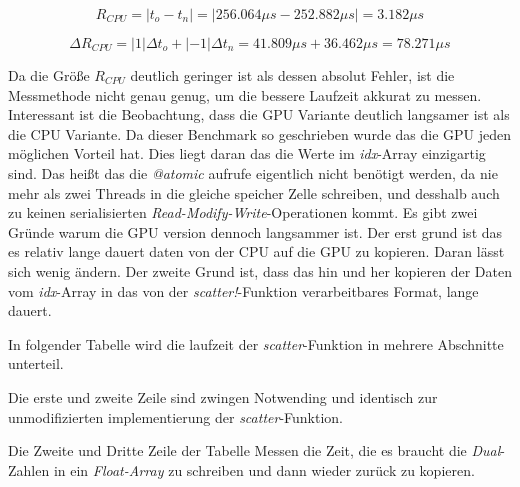 $$
R_{CPU} = |t_o - t_n| = | 256.064 \mu s - 252.882 \mu s | =  3.182 \mu s
$$

$$
\Delta R_{CPU} = | 1 | \Delta t_o + |-1| \Delta t_n  = 41.809 \mu s + 36.462 \mu s = 78.271 \mu s
$$


Da die Größe $R_{CPU}$ deutlich geringer ist als dessen absolut Fehler, ist die Messmethode nicht genau genug, um die bessere Laufzeit akkurat zu messen.
Interessant ist die Beobachtung, dass die GPU Variante deutlich langsamer ist als die CPU Variante.
Da dieser Benchmark so geschrieben wurde das die GPU jeden möglichen Vorteil hat.
Dies liegt daran das die Werte im \textit{idx}-Array einzigartig sind.
Das heißt das die \textit{@atomic} aufrufe eigentlich nicht benötigt werden, da nie mehr als zwei Threads in die gleiche speicher Zelle schreiben,
und desshalb auch zu keinen serialisierten \textit{Read-Modify-Write}-Operationen kommt.
Es gibt zwei Gründe warum die GPU version dennoch langsammer ist.
Der erst grund ist das es relativ lange dauert daten von der CPU auf die GPU zu kopieren.
Daran lässt sich wenig ändern.
Der zweite Grund ist, dass das hin und her kopieren der Daten vom \textit{idx}-Array in das von der \textit{scatter!}-Funktion verarbeitbares Format, 
lange dauert. 


In folgender Tabelle wird die laufzeit der \textit{scatter}-Funktion in mehrere Abschnitte unterteil.

Die erste und zweite Zeile sind zwingen Notwending und identisch zur unmodifizierten implementierung der \textit{scatter}-Funktion.

Die Zweite und Dritte Zeile der Tabelle Messen die Zeit, 
die es braucht die \textit{Dual}-Zahlen in ein \textit{Float-Array} zu schreiben 
und dann wieder zurück zu kopieren.


